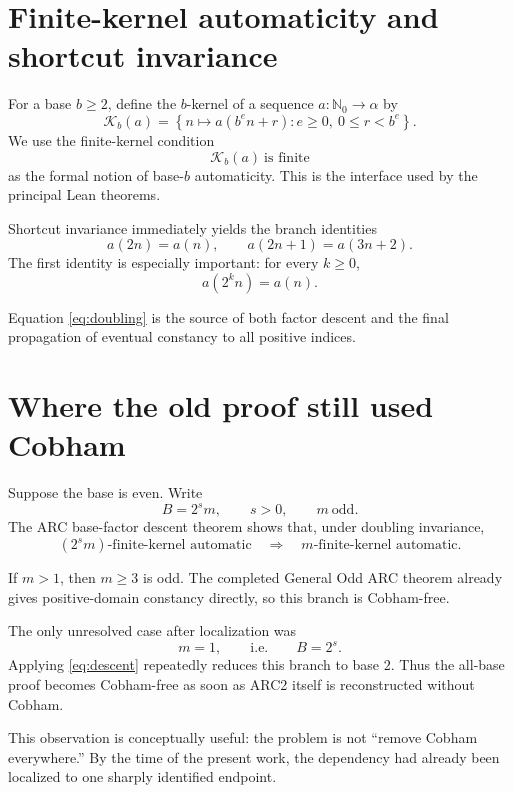 \documentclass[11pt]{article}
\theoremstyle{remark}
\newcommand{\Nzero}{\mathbb{N}_0}
\newcommand{\ARCKernel}{\mathcal{K}}
\begin{document}
\section{Finite-kernel automaticity and shortcut invariance}

For a base $b\ge2$, define the $b$-kernel of a sequence $a:\Nzero\to\alpha$ by
\[
\ARCKernel_b(a)
=
\left\{
n\longmapsto a(b^e n+r)
:
e\ge0,\ 0\le r<b^e
\right\}.
\]
We use the finite-kernel condition
\[
\ARCKernel_b(a)\ \text{is finite}
\]
as the formal notion of base-$b$ automaticity.  This is the interface used by
the principal Lean theorems.

Shortcut invariance immediately yields the branch identities
\begin{equation}\label{eq:branches}
a(2n)=a(n),
\qquad
a(2n+1)=a(3n+2).
\end{equation}
The first identity is especially important: for every $k\ge0$,
\begin{equation}\label{eq:doubling}
a(2^k n)=a(n).
\end{equation}

Equation \eqref{eq:doubling} is the source of both factor descent and the final
propagation of eventual constancy to all positive indices.

\section{Where the old proof still used Cobham}

Suppose the base is even.  Write
\[
B=2^s m,
\qquad
s>0,
\qquad
m\ \text{odd}.
\]
The ARC base-factor descent theorem shows that, under doubling invariance,
\begin{equation}\label{eq:descent}
(2^s m)\text{-finite-kernel automatic}
\quad\Longrightarrow\quad
m\text{-finite-kernel automatic}.
\end{equation}

If $m>1$, then $m\ge3$ is odd.  The completed General Odd ARC theorem already
gives positive-domain constancy directly, so this branch is Cobham-free.

The only unresolved case after localization was
\[
m=1,
\qquad\text{i.e.}\qquad
B=2^s.
\]
Applying \eqref{eq:descent} repeatedly reduces this branch to base $2$.
Thus the all-base proof becomes Cobham-free as soon as ARC2 itself is
reconstructed without Cobham.

This observation is conceptually useful: the problem is not ``remove Cobham
everywhere.''  By the time of the present work, the dependency had already been
localized to one sharply identified endpoint.
\end{document}
